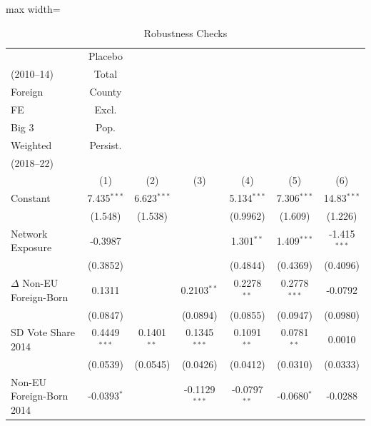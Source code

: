
\begin{table}[htbp]
   \caption{\label{tab:robustness} Robustness Checks}
   \bigskip
   \centering
   \begin{adjustbox}{max width=\textwidth}
   \begin{tabular}{lcccccc}
      \toprule
                                    & Placebo\\(2010--14)   & Total\\Foreign   & County\\FE      & Excl.\\Big 3   & Pop.\\Weighted   & Persist.\\(2018--22) \\     
                                    & (1)                   & (2)              & (3)             & (4)            & (5)              & (6)\\  
      \midrule 
      Constant                      & 7.435$^{***}$         & 6.623$^{***}$    &                 & 5.134$^{***}$  & 7.306$^{***}$    & 14.83$^{***}$\\   
                                    & (1.548)               & (1.538)          &                 & (0.9962)       & (1.609)          & (1.226)\\   
      Network Exposure              & -0.3987               &                  &                 & 1.301$^{**}$   & 1.409$^{***}$    & -1.415$^{***}$\\   
                                    & (0.3852)              &                  &                 & (0.4844)       & (0.4369)         & (0.4096)\\   
      $\Delta$ Non-EU Foreign-Born  & 0.1311                &                  & 0.2103$^{**}$   & 0.2278$^{**}$  & 0.2778$^{***}$   & -0.0792\\   
                                    & (0.0847)              &                  & (0.0894)        & (0.0855)       & (0.0947)         & (0.0980)\\   
      SD Vote Share 2014            & 0.4449$^{***}$        & 0.1401$^{**}$    & 0.1345$^{***}$  & 0.1091$^{**}$  & 0.0781$^{**}$    & 0.0010\\   
                                    & (0.0539)              & (0.0545)         & (0.0426)        & (0.0412)       & (0.0310)         & (0.0333)\\   
      Non-EU Foreign-Born 2014      & -0.0393$^{*}$         &                  & -0.1129$^{***}$ & -0.0797$^{**}$ & -0.0680$^{*}$    & -0.0288\\   

\end{tabular}
\end{adjustbox}
\end{table}

